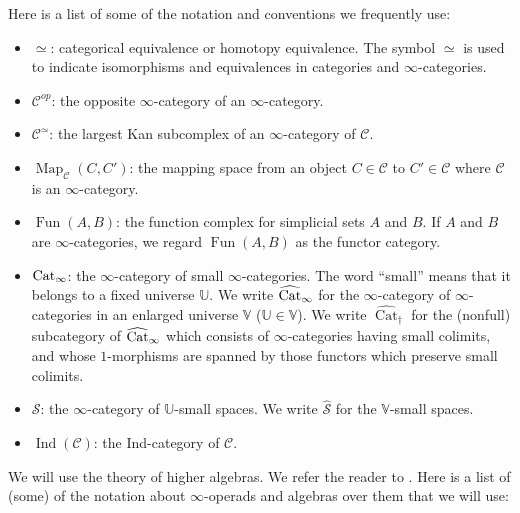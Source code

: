 \documentclass[leqno,12pt]{amsart}
\theoremstyle{plain}
\theoremstyle{definition}
\newcommand{\CCC}{\mathcal{C}}
\newcommand{\SSS}{\mathcal{S}}
\newcommand{\wSSS}{\widehat{\mathcal{S}}}
\newcommand{\Cat}{\textup{Cat}_{\infty}}
\newcommand{\Map}{\operatorname{Map}}
\newcommand{\Fun}{\operatorname{Fun}}
\newcommand{\wCat}{\widehat{\textup{Cat}}_{\infty}}
\newcommand{\vCat}{\widehat{\operatorname{Cat}}_\dagger}
\newcommand{\Ind}{\operatorname{Ind}}
\begin{document}
Here is a list of some of the notation and conventions we frequently use:




\begin{itemize}

\item $\simeq$: categorical equivalence or homotopy equivalence.  The symbol $\simeq$ is used to indicate isomorphisms and equivalences in categories and
$\infty$-categories.

\item $\CCC^{op}$: the opposite $\infty$-category of an $\infty$-category.

\item $\CCC^{\simeq}$: the largest Kan subcomplex of an $\infty$-category of $\CCC$.


\item $\Map_{\mathcal{C}}(C,C')$: the mapping space from an object $C\in\mathcal{C}$ to $C'\in \mathcal{C}$ where $\mathcal{C}$ is an $\infty$-category.


\item $\Fun(A,B)$: the function complex for simplicial sets $A$ and $B$. If $A$ and $B$ are $\infty$-categories, we regard $\Fun(A,B)$ as the functor category. 




\item $\Cat$: the $\infty$-category of small $\infty$-categories. The word ``small'' means that it belongs to a fixed universe $\mathbb{U}$.
We write $\wCat$ for the $\infty$-category of $\infty$-categories in an enlarged universe $\mathbb{V}$ ($\mathbb{U}\in \mathbb{V}$). 
We write $\vCat$ for the (nonfull) subcategory of $\wCat$ which consists of $\infty$-categories having small colimits,
and whose $1$-morphisms are spanned by those functors which preserve small colimits.

\item $\SSS$: the $\infty$-category of $\mathbb{U}$-small spaces. We write $\wSSS$ for the $\mathbb{V}$-small spaces.


\item $\Ind(\CCC)$: the Ind-category of $\CCC$.

\end{itemize}


We will use the theory of higher algebras.
We refer the reader to \cite{HA}.
Here is a list of (some) of the notation about $\infty$-operads and algebras over them that we will use:
\end{document}
